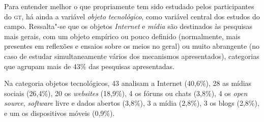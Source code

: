 Para entender melhor o que propriamente tem sido estudado pelos
participantes do \textsc{gt}, há ainda a variável \textit{objeto tecnológico}, como
variável central dos estudos do campo. Ressalta"-se que os objetos
\textit{Internet} e \textit{mídia} são destinados às pesquisas mais gerais, com um
objeto empírico ou pouco definido (normalmente, mais presentes em
reflexões e ensaios sobre os meios no geral) ou muito abrangente (no
caso de estudar simultaneamente vários dos mecanismos apresentados),
categorias que agrupam mais de 43\% das pesquisas apresentadas.

Na categoria objetos tecnológicos, 43 analisam a Internet (40,6\%), 28 as mídias sociais (26,4\%), 20 os \textit{websites} (18,9\%), 4 os fóruns ou chats (3,8\%), 4 os \textit{open source}, \textit{software} livre e dados abertos (3,8\%), 3 a mídia (2,8\%), 3 os blogs (2,8\%), e um os dispositivos móveis (0,9\%).

